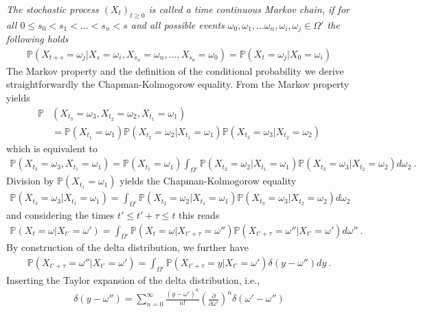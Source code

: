 \documentclass[11pt,a4paper]{article}
\numberwithin{equation}{section}
\begin{document}
\textit{
The stochastic process $(X_t)_{t\geq 0 }$ is called a time continuous Markov chain, if for all $0\leq s_0<s_1<...<s_n<s$ and all possible events $\omega_0,\omega_1,...\omega_n,\omega_i,\omega_j\in\Omega'$ the following holds
\begin{align*}
\mathbb{P}(X_{t+s}=\omega_j|X_{s}=\omega_i,X_{s_n}=\omega_n,..., X_{s_0}=\omega_0)
=
\mathbb{P}(X_{t}=\omega_j|X_{0}=\omega_i)
\end{align*}
} 
The Markov property and the definition of the conditional probability we derive straightforwardly the Chapman-Kolmogorow equality. 
%
From the Markov property yields
\begin{align*}
\mathbb{P}&(X_{t_3}=\omega_{3},X_{t_2}=\omega_{2},X_{t_1}=\omega_{1})\\
&=
\mathbb{P}(X_{t_1}=\omega_{1})\mathbb{P}(X_{t_2}=\omega_{2}|X_{t_1}=\omega_{1})\mathbb{P}(X_{t_3}=\omega_{3}|X_{t_2}=\omega_{2})
\end{align*}
which is equivalent to
\begin{align*}
\mathbb{P}(X_{t_3}=\omega_{3},X_{t_1}=\omega_{1})
=
\mathbb{P}(X_{t_1}=\omega_{1})\int_{\Omega'}\mathbb{P}(X_{t_2}=\omega_{2}|X_{t_1}=\omega_{1})\mathbb{P}(X_{t_3}=\omega_{3}|X_{t_2}=\omega_{2})d\omega_{2}~.
\end{align*}
Division by $\mathbb{P}(X_{t_1}=\omega_{1})$ yields the Chapman-Kolmogorow equality
\begin{align*}
\label{eq:Chapman-Kolmogorow}
\mathbb{P}(X_{t_3}=\omega_{3}|X_{t_1}=\omega_{1})
=\int_{\Omega'}\mathbb{P}(X_{t_2}=\omega_{2}|X_{t_1}=\omega_{1})\mathbb{P}(X_{t_3}=\omega_{3}|X_{t_2}=\omega_{2})d\omega_{2}
\end{align*}
and considering the times $t'\leq t'+\tau\leq t$ this reads
\begin{align}
\label{eq:Chapman-KolmogorowApl}
\mathbb{P}(X_{t}=\omega|X_{t'}=\omega')
=\int_{\Omega'}\mathbb{P}(X_{t}=\omega|X_{t'+\tau}=\omega'')\mathbb{P}(X_{t'+\tau}=\omega''|X_{t'}=\omega' )d\omega''~.
\end{align}
By construction of the delta distribution, we further have
\begin{align}
\label{eq:Integrant1}
\mathbb{P}(X_{t'+\tau}=\omega''|X_{t'}=\omega')
=
\int_{\Omega'}\mathbb{P}(X_{t'+\tau}=y|X_{t'}=\omega')\delta(y-\omega'')dy~.
\end{align}
Inserting the Taylor expansion of the delta distribution, i.e.,
\begin{align*}
\delta(y-\omega'') = \sum_{n=0}^{\infty}\frac{(y-\omega')^n}{n!}\left( \frac{\partial}{\partial \omega'} \right)^n\delta(\omega'-\omega'')
\end{align*}
\end{document}

